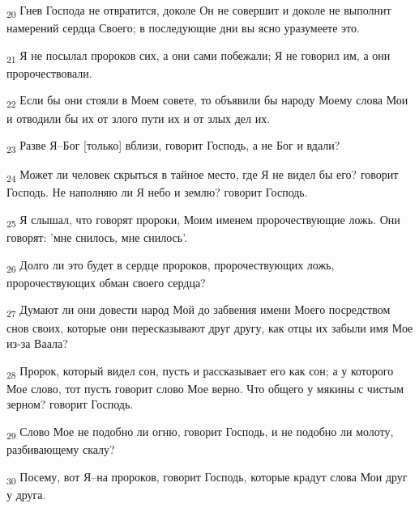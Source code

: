 \begin{tcolorbox}
\textsubscript{20} Гнев Господа не отвратится, доколе Он не совершит и доколе не выполнит намерений сердца Своего; в последующие дни вы ясно уразумеете это.
\end{tcolorbox}
\begin{tcolorbox}
\textsubscript{21} Я не посылал пророков сих, а они сами побежали; Я не говорил им, а они пророчествовали.
\end{tcolorbox}
\begin{tcolorbox}
\textsubscript{22} Если бы они стояли в Моем совете, то объявили бы народу Моему слова Мои и отводили бы их от злого пути их и от злых дел их.
\end{tcolorbox}
\begin{tcolorbox}
\textsubscript{23} Разве Я--Бог [только] вблизи, говорит Господь, а не Бог и вдали?
\end{tcolorbox}
\begin{tcolorbox}
\textsubscript{24} Может ли человек скрыться в тайное место, где Я не видел бы его? говорит Господь. Не наполняю ли Я небо и землю? говорит Господь.
\end{tcolorbox}
\begin{tcolorbox}
\textsubscript{25} Я слышал, что говорят пророки, Моим именем пророчествующие ложь. Они говорят: 'мне снилось, мне снилось'.
\end{tcolorbox}
\begin{tcolorbox}
\textsubscript{26} Долго ли это будет в сердце пророков, пророчествующих ложь, пророчествующих обман своего сердца?
\end{tcolorbox}
\begin{tcolorbox}
\textsubscript{27} Думают ли они довести народ Мой до забвения имени Моего посредством снов своих, которые они пересказывают друг другу, как отцы их забыли имя Мое из-за Ваала?
\end{tcolorbox}
\begin{tcolorbox}
\textsubscript{28} Пророк, который видел сон, пусть и рассказывает его как сон; а у которого Мое слово, тот пусть говорит слово Мое верно. Что общего у мякины с чистым зерном? говорит Господь.
\end{tcolorbox}
\begin{tcolorbox}
\textsubscript{29} Слово Мое не подобно ли огню, говорит Господь, и не подобно ли молоту, разбивающему скалу?
\end{tcolorbox}
\begin{tcolorbox}
\textsubscript{30} Посему, вот Я--на пророков, говорит Господь, которые крадут слова Мои друг у друга.
\end{tcolorbox}
